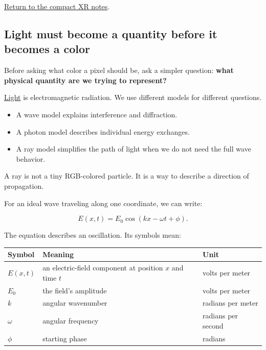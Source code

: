 \hyperref[appendix-73c6b8ed5a87-figure-linked-short-notes]{Return to the compact XR notes}.

\subsection{Light must become a quantity before it becomes a color}\label{04-visual-computing-ii-ch043-light-must-become-a-quantity-before-it-becomes-a-color}

Before asking what color a pixel should be, ask a simpler question: \textbf{what physical quantity are we trying to represent?}

\hyperref[appendix-215c2570199b]{Light} is electromagnetic radiation. We use different models for different questions.

\begin{itemize}
\tightlist
\item
  A wave model explains interference and diffraction.
\item
  A photon model describes individual energy exchanges.
\item
  A ray model simplifies the path of light when we do not need the full wave behavior.
\end{itemize}

A ray is not a tiny RGB-colored particle. It is a way to describe a direction of propagation.

For an ideal wave traveling along one coordinate, we can write:

\[
E(x,t)=E_0\cos(kx-\omega t+\phi).
\]

The equation describes an oscillation. Its symbols mean:

{\def\LTcaptype{none} %
\begin{longtable}[]{@{}
  >{\raggedright\arraybackslash}p{}
  >{\raggedright\arraybackslash}p{}
  >{\raggedright\arraybackslash}p{}@{}}
\toprule\noalign{}
\begin{minipage}[b]{\linewidth}\raggedright
Symbol
\end{minipage} & \begin{minipage}[b]{\linewidth}\raggedright
Meaning
\end{minipage} & \begin{minipage}[b]{\linewidth}\raggedright
Unit
\end{minipage} \\
\midrule\noalign{}
\endhead
\bottomrule\noalign{}
\endlastfoot
\(E(x,t)\) & an electric-field component at position \(x\) and time \(t\) & volts per meter \\
\(E_0\) & the field's amplitude & volts per meter \\
\(k\) & angular wavenumber & radians per meter \\
\(\omega\) & angular frequency & radians per second \\
\(\phi\) & starting phase & radians \\
\end{longtable}
}

